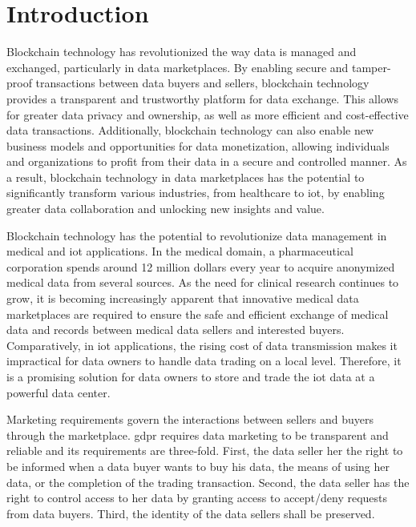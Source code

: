 \section{Introduction}
\label{sec:introduction}

Blockchain technology has revolutionized the way data is managed and exchanged, particularly in data marketplaces.
By enabling secure and tamper-proof transactions between data buyers and sellers, blockchain technology provides a transparent and trustworthy platform for data exchange.
This allows for greater data privacy and ownership, as well as more efficient and cost-effective data transactions.
Additionally, blockchain technology can also enable new business models and opportunities for data monetization, allowing individuals and organizations to profit from their data in a secure and controlled manner.
As a result, blockchain technology in data marketplaces has the potential to significantly transform various industries, from healthcare to \ac{iot}, by enabling greater data collaboration and unlocking new insights and value.

Blockchain technology has the potential to revolutionize data management in medical and \ac{iot} applications.
In the medical domain, a pharmaceutical corporation spends around 12 million dollars every year to acquire anonymized medical data from several sources.
As the need for clinical research continues to grow, it is becoming increasingly apparent that innovative medical data marketplaces are required to ensure the safe and efficient exchange of medical data and records between medical data sellers and interested buyers.
Comparatively, in \ac{iot} applications, the rising cost of data transmission makes it impractical for data owners to handle data trading on a local level.
Therefore, it is a promising solution for data owners to store
and trade the \ac{iot} data at a powerful data center.

Marketing requirements govern the interactions between sellers and buyers through the marketplace.
\ac{gdpr} requires data marketing to be transparent and reliable and its requirements are three-fold.
First, the data seller her the right to be informed when a data buyer wants to buy his data, the means of using  her data, or the completion of the trading transaction.
Second, the data seller has the right to control access to her data by granting access to accept/deny requests from data buyers.
Third, the identity of the data sellers shall be preserved.

